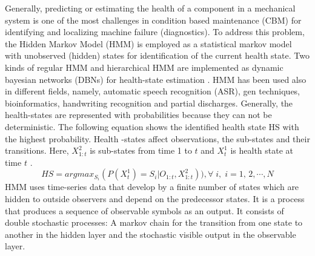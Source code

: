 Generally, predicting or estimating the health of a component in a mechanical system is one of the most challenges in condition based maintenance (CBM) for identifying and localizing machine failure (diagnostics). To address this problem, the Hidden Markov Model (HMM) is employed as a statistical markov model with unobserved (hidden) states for identification of the  current health state. Two kinds of regular HMM and hierarchical HMM are implemented as dynamic bayesian networks (DBNs) for health-state estimation \cite{DBLP:journals/tase/CamciC10, zhang2005integrated}.
 HMM has been used also in different fields, namely, automatic speech recognition (ASR), gen techniques, bioinformatics, handwriting recognition and partial discharges. Generally, the health-states are represented with probabilities because they can not be deterministic. The following equation shows the identified health state HS with the highest probability. Health -states affect observations, the sub-states and their transitions. Here, $X_{1:t}^{2}$ is sub-states from time 1 to $t$ and $X_{t}^{1}$ is health state at time $t$ \cite{DBLP:journals/tase/CamciC10}.
\begin{equation}
    HS=argmax_{S_{i}}(P(X_{t}^{1})=S_{i}|O_{1:t},X_{1:t}^{2})),\forall \;i,\;  i=1 ,\,2, \cdots ,N
\end{equation}
HMM uses time-series data that develop by a finite number of states which are hidden to outside observers and depend on the predecessor states. It is a process that produces a sequence of observable symbols as an output.
It consists of double stochastic processes:  A markov chain for the transition from one state to another in the hidden layer and the stochastic visible output in the observable layer. 

